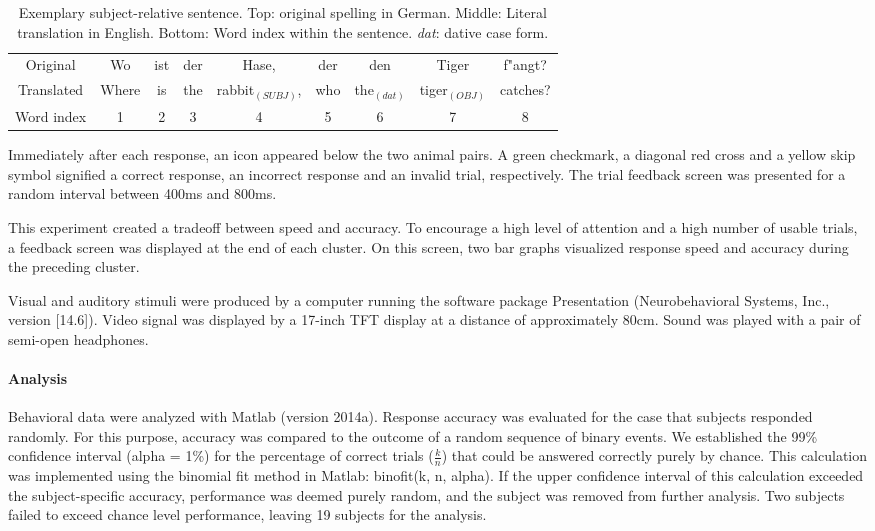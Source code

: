 \vspace{5mm}
\begin{table}[htb]
\begin{center}
\begin{tabular}{ccccccccc}
Original & Wo & ist & der & Hase, & der & den & Tiger & f"angt?\\
Translated & Where & is & the & rabbit$_{(SUBJ)}$, & who & the$_{(dat)}$ & tiger$_{(OBJ)}$ & catches?\\
Word index & 1 & 2 & 3 & 4 & 5 & 6 & 7 & 8
\end{tabular}
\caption{\label{2.sentences} Exemplary subject-relative sentence. Top: original spelling in German. Middle: Literal translation in English. Bottom: Word index within the sentence. \emph{dat}: dative case form.}
\end{center}
\end{table}
\vspace{5mm}

Immediately after each response, an icon appeared below the two animal pairs.
A green checkmark, a diagonal red cross and a yellow skip symbol signified a correct response, an incorrect response and an invalid trial, respectively.
The trial feedback screen was presented for a random interval between 400ms and 800ms.

This experiment created a tradeoff between speed and accuracy.
To encourage a high level of attention and a high number of usable trials, a feedback screen was displayed at the end of each cluster.
On this screen, two bar graphs visualized response speed and accuracy during the preceding cluster.

Visual and auditory stimuli were produced by a computer running the software package Presentation (Neurobehavioral Systems, Inc., version [14.6]).
Video signal was displayed by a 17-inch TFT display at a distance of approximately 80cm.
Sound was played with a pair of semi-open headphones.


\paragraph{Analysis}

Behavioral data were analyzed with Matlab (version 2014a).
Response accuracy was evaluated for the case that subjects responded randomly.
For this purpose, accuracy was compared to the outcome of a random sequence of binary events.
We established the 99\% confidence interval (alpha = 1\%) for the percentage of correct trials ($\frac{k}{n}$) that could be answered correctly purely by chance.
This calculation was implemented using the binomial fit method in Matlab: binofit(k, n, alpha).
If the upper confidence interval of this calculation exceeded the subject-specific accuracy, performance was deemed purely random, and the subject was removed from further analysis.
Two subjects failed to exceed chance level performance, leaving 19 subjects for the analysis.

